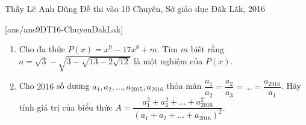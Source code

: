 \begin{name}
{Thầy  Lê Anh Dũng}
{Đề thi vào 10 Chuyên, Sở giáo dục Đăk Lăk, 2016}
\end{name}
\setcounter{ex}{0}
[ans/ans9DT16-ChuyenDakLak]
\begin{ex}%
\begin{enumerate}[1)]
\item Cho đa thức $P(x)=x^9-17x^8+m$. Tìm $m$ biết rằng $a=\sqrt{3}-\sqrt{3-\sqrt{13-2\sqrt{12}}}$ là một nghiệm của $P(x)$.
\item Cho $2016$ số dương $a_1,a_2,\ldots,a_{2015},a_{2016}$ thỏa mãn $\dfrac{a_1}{a_2}=\dfrac{a_2}{a_3}=\ldots=\dfrac{a_{2016}}{a_1}$. Hãy tính giá trị của biểu thức $A=\dfrac{a_1^2+a_2^2+\ldots+a_{2016}^2}{\left(a_1+a_2+\ldots+a_{2016}\right)^2}$.
\end{enumerate}
\end{ex}

